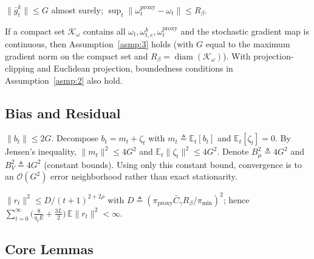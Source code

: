 \begin{assumption}\label{asmp:3}
  \(\|\bar g_t^k\| \le G\) almost surely;\;
  \(\sup_t \|\omega_t^{\mathrm{proxy}} - \omega_t\| \le R_\beta\).
\end{assumption}

\begin{proposition}\label{prop:1}
  If a compact set \(\mathcal K_\omega\) contains all \(\omega_t, \omega_{t,e}^k, \omega_t^{\mathrm{proxy}}\) and the stochastic gradient map is continuous, then Assumption~\ref{asmp:3} holds (with \(G\) equal to the maximum gradient norm on the compact set and \(R_\beta = \operatorname{diam}(\mathcal K_\omega)\)).
  With projection-clipping and Euclidean projection, boundedness conditions in Assumption~\ref{asmp:2} also hold.
\end{proposition}

\subsection{Bias and Residual}

\begin{proposition}\label{prop:2}
  \(\|b_t\| \le 2G\). Decompose \(b_t = m_t + \zeta_t\) with
  \(m_t \triangleq \mathbb E_t[b_t]\) and \(\mathbb E_t[\zeta_t] = 0\).
  By Jensen's inequality,
  \(\|m_t\|^2 \le 4G^2\) and \(\mathbb E_t\|\zeta_t\|^2 \le 4G^2\).
  Denote \(B_\mu^2 \triangleq 4G^2\) and \(B_V^2 \triangleq 4G^2\) (constant bounds).
  Using only this constant bound, convergence is to an \(\mathcal O(G^2)\) error neighborhood rather than exact stationarity.
\end{proposition}

\begin{proposition}\label{prop:3}
  \(\|r_t\|^2 \le D/(t+1)^{2+2\rho}\) with \(D \triangleq (\pi_{\mathrm{proxy}}\bar C_\gamma R_\beta / \pi_{\min})^{2}\);
  hence \(\sum_{t=0}^{\infty}\bigl(\frac{8}{\eta_t E} + \frac{3L}{2}\bigr)\,\mathbb E\|r_t\|^2 < \infty\).
\end{proposition}

\subsection{Core Lemmas}

